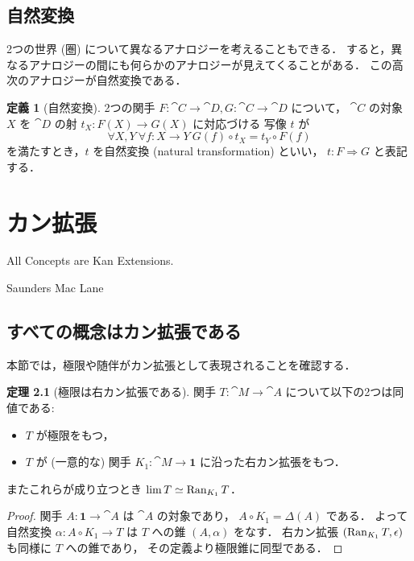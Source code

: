 \documentclass[titlepage]{ltjsreport}
\theoremstyle{definition}
\newtheorem{definition}{定義}[chapter]
\newtheorem{theorem}{定理}[chapter]
\begin{document}
\section{自然変換}

2つの世界 (圏) について異なるアナロジーを考えることもできる．
すると，異なるアナロジーの間にも何らかのアナロジーが見えてくることがある．
この高次のアナロジーが自然変換である．

\begin{definition}[自然変換]
  2つの関手 $F:\cat{C}\to\cat{D},G:\cat{C}\to\cat{D}$ について，
  $\cat{C}$ の対象 $X$ を $\cat{D}$ の射 $t_X:F(X)\to G(X)$ に対応づける
  写像 $t$ が
  \begin{equation}
    \forall X,Y\ \forall f:X\to Y\ G(f)\circ t_X=t_Y\circ F(f)
  \end{equation}
  を満たすとき，$t$ を自然変換 (natural transformation) といい，
  $t:F\Rightarrow G$ と表記する．
\end{definition}

\chapter{カン拡張}

\epigraph{All Concepts are Kan Extensions.}{Saunders Mac Lane}

\section{すべての概念はカン拡張である}

本節では，極限や随伴がカン拡張として表現されることを確認する．

\begin{theorem}[極限は右カン拡張である]\label{thm:limit-is-right-kan-extension}
  関手 $T:\cat{M}\to\cat{A}$ について以下の2つは同値である:
  \begin{itemize}
    \item $T$ が極限をもつ，
    \item $T$ が (一意的な) 関手 $K_1:\cat{M}\to\mathbf{1}$
          に沿った右カン拡張をもつ．
  \end{itemize}
  またこれらが成り立つとき $\lim T\simeq\operatorname{Ran}_{K_1}T$．
\end{theorem}

\begin{proof}
  関手 $A:\mathbf{1}\to\cat{A}$ は $\cat{A}$ の対象であり，
  $A\circ K_1=\Delta(A)$ である．
  よって自然変換 $\alpha:A\circ K_1\to T$ は $T$ への錐 $(A,\alpha)$ をなす．
  右カン拡張 $(\operatorname{Ran}_{K_1}T,\epsilon)$ も同様に $T$ への錐であり，
  その定義より極限錐に同型である．
\end{proof}
\end{document}
